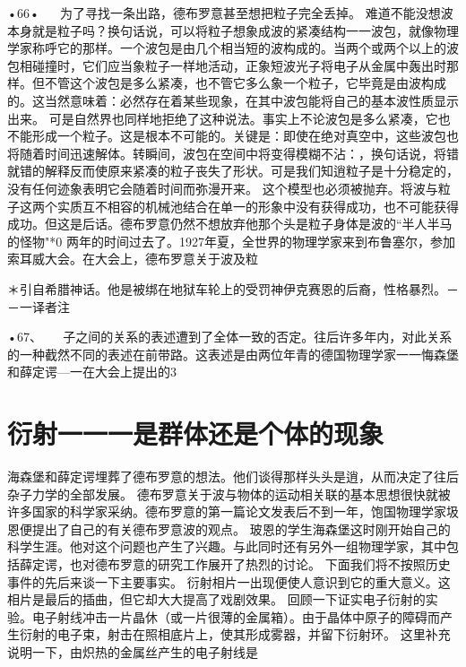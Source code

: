 •66•
  
为了寻找一条出路，德布罗意甚至想把粒子完全丢掉。
难道不能没想波本身就是粒子吗？换句话说，可以将粒子想象成波的紧凑结构一一波包，就像物理学家称呼它的那样。一个波包是由几个相当短的波构成的。当两个或两个以上的波包相碰撞时，它们应当象粒子一样地活动，正象短波光子将电子从金属中轰出时那样。但不管这个波包是多么紧凑，也不管它多么象一个粒子，它毕竟是由波构成的。这当然意味着：必然存在着某些现象，在其中波包能将自己的基本波性质显示出来。
可是自然界也同样地拒绝了这种说法。事实上不论波包是多么紧凑，它也不能形成一个粒子。这是根本不可能的。关键是：即使在绝对真空中，这些波包也将随着时间迅速解体。转瞬间，波包在空间中将变得模糊不沾：，换句话说，将错就错的解释反而使原来紧凑的粒子丧失了形状。可是我们知逍粒子是十分稳定的，没有任何迹象表明它会随着时间而弥漫开来。
这个模型也必须被抛弃。将波与粒子这两个实质互不相容的机械池结合在单一的形象中没有获得成功，也不可能获得成功。但这是后话。德布罗意仍然不想放弃他那个头是粒子身体是波的“半人半马的怪物"*0
两年的时间过去了。1927年夏，全世界的物理学家来到布鲁塞尔，参加索耳威大会。在大会上，德布罗意关于波及粒

＊引自希腊神话。他是被绑在地狱车轮上的受罚神伊克赛恩的后裔，性格暴烈。－－一译者注

•67、
  
子之间的关系的表述遭到了全体一致的否定。往后许多年内，对此关系的一种截然不同的表述在前带路。这表述是由两位年青的德国物理学家一一悔森堡和薛定谔—一在大会上提出的3

\section{衍射一一一是群体还是个体的现象}

海森堡和薛定谔埋葬了德布罗意的想法。他们谈得那样头头是逍，从而决定了往后杂子力学的全部发展。
德布罗意关于波与物体的运动相关联的基本思想很快就被许多国家的科学家采纳。德布罗意的第一篇论文发表后不到一年，饱国物理学家圾恩便提出了自己的有关德布罗意波的观点。
玻恩的学生海森堡这时刚开始自己的科学生涯。他对这个问题也产生了兴趣。与此同时还有另外一组物理学家，其中包括薛定谔，也对德布罗意的研究工作展开了热烈的讨论。
下面我们将不按照历史事件的先后来谈一下主要事实。
衍射相片一出现便使人意识到它的重大意义。这相片是最后的插曲，但它却大大提高了戏剧效果。
回顾一下证实电子衍射的实验。电子射线冲击一片晶休（或一片很薄的金属箱）。由于晶体中原子的障碍而产生衍射的电子束，射击在照相底片上，使其形成雾器，并留下衍射环。
这里补充说明一下，由炽热的金属丝产生的电子射线是

